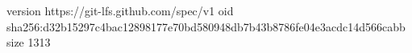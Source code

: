 version https://git-lfs.github.com/spec/v1
oid sha256:d32b15297c4bac12898177e70bd580948db7b43b8786fe04e3acdc14d566cabb
size 1313
